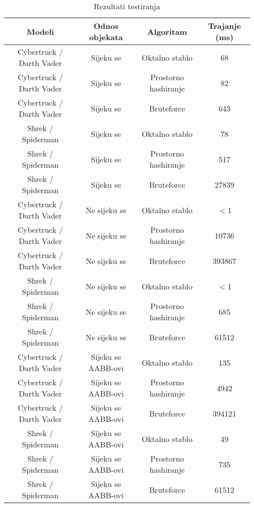 \begin{table}[h!]
    \begin{center}
      \begin{tabular}{ | c | c | c | c | }
        \hline
        \textbf{Modeli} & \textbf{Odnos objekata} & \textbf{Algoritam} & \textbf{Trajanje (ms)} \\
        \hline
         Cybertruck / Darth Vader & Sijeku se & Oktalno stablo & 68 \\
        \hline
         Cybertruck / Darth Vader & Sijeku se & Prostorno hashiranje & 82 \\
        \hline
         Cybertruck / Darth Vader & Sijeku se & Bruteforce & 643 \\
        \hline
         Shrek / Spiderman & Sijeku se & Oktalno stablo & 78 \\
        \hline
         Shrek / Spiderman & Sijeku se & Prostorno hashiranje & 517 \\
        \hline
         Shrek / Spiderman & Sijeku se & Bruteforce & 27839 \\
        \hline

         Cybertruck / Darth Vader & Ne sijeku se & Oktalno stablo & $<$1 \\
        \hline
         Cybertruck / Darth Vader & Ne sijeku se & Prostorno hashiranje & 10736 \\
        \hline
         Cybertruck / Darth Vader & Ne sijeku se & Bruteforce & 393867 \\
        \hline
         Shrek / Spiderman & Ne sijeku se & Oktalno stablo & $<$1 \\
        \hline
         Shrek / Spiderman & Ne sijeku se & Prostorno hashiranje & 685 \\
        \hline
         Shrek / Spiderman & Ne sijeku se & Bruteforce & 61512 \\
        \hline

         Cybertruck / Darth Vader & Sijeku se AABB-ovi & Oktalno stablo & 135 \\
        \hline
         Cybertruck / Darth Vader & Sijeku se AABB-ovi & Prostorno hashiranje & 4942 \\
        \hline
         Cybertruck / Darth Vader & Sijeku se AABB-ovi & Bruteforce & 394121 \\
        \hline
         Shrek / Spiderman & Sijeku se AABB-ovi & Oktalno stablo & 49 \\
        \hline
         Shrek / Spiderman & Sijeku se AABB-ovi & Prostorno hashiranje & 735 \\
        \hline
         Shrek / Spiderman & Sijeku se AABB-ovi & Bruteforce & 61512 \\
        \hline
      \end{tabular}
    \end{center}
  \caption{Rezultati testiranja}
  \label{table:testresults}
\end{table}
